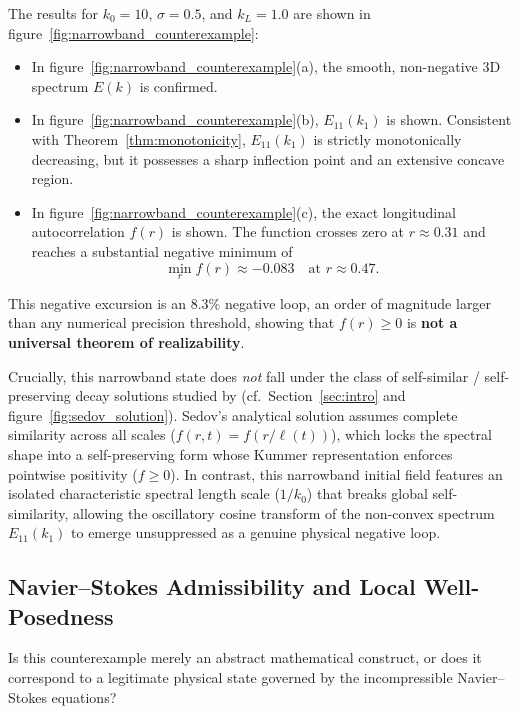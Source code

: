 \documentclass[lineno]{jfm}
\begin{document}
The results for $k_0 = 10$, $\sigma = 0.5$, and $k_L = 1.0$ are shown in figure~\ref{fig:narrowband_counterexample}:
\begin{itemize}
\item In figure~\ref{fig:narrowband_counterexample}(a), the smooth, non-negative 3D spectrum $E(k)$ is confirmed.
\item In figure~\ref{fig:narrowband_counterexample}(b), $E_{11}(k_1)$ is shown. Consistent with Theorem~\ref{thm:monotonicity}, $E_{11}(k_1)$ is strictly monotonically decreasing, but it possesses a sharp inflection point and an extensive concave region.
\item In figure~\ref{fig:narrowband_counterexample}(c), the exact longitudinal autocorrelation $f(r)$ is shown. The function crosses zero at $r \approx 0.31$ and reaches a substantial negative minimum of
\begin{equation}
\min_{r} f(r) \approx -0.083 \quad \text{at } r \approx 0.47.
\label{eq:f_min_val}
\end{equation}
\end{itemize}
This negative excursion is an $8.3\%$ negative loop, an order of magnitude larger than any numerical precision threshold, showing that $f(r) \ge 0$ is \textbf{not a universal theorem of realizability}.

Crucially, this narrowband state does \emph{not} fall under the class of self-similar / self-preserving decay solutions studied by \citet{Sedov1944} (cf.~Section~\ref{sec:intro} and figure~\ref{fig:sedov_solution}). Sedov's analytical solution assumes complete similarity across all scales ($f(r, t) = f(r/\ell(t))$), which locks the spectral shape into a self-preserving form whose Kummer representation enforces pointwise positivity ($f \ge 0$). In contrast, this narrowband initial field features an isolated characteristic spectral length scale ($1/k_0$) that breaks global self-similarity, allowing the oscillatory cosine transform of the non-convex spectrum $E_{11}(k_1)$ to emerge unsuppressed as a genuine physical negative loop.

\subsection{Navier--Stokes Admissibility and Local Well-Posedness}

Is this counterexample merely an abstract mathematical construct, or does it correspond to a legitimate physical state governed by the incompressible Navier--Stokes equations?
\end{document}

